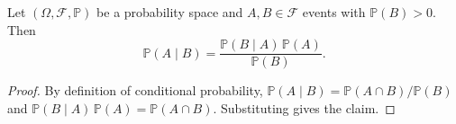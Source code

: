 \documentclass{article}
\begin{document}
\begin{theorem}
Let $(\Omega, \mathcal{F}, \mathbb{P})$ be a probability space and $A, B \in \mathcal{F}$ events with
$\mathbb{P}(B) > 0$. Then
\[
\mathbb{P}(A \mid B) = \frac{\mathbb{P}(B \mid A)\, \mathbb{P}(A)}{\mathbb{P}(B)}.
\]
\end{theorem}

\begin{proof}
By definition of conditional probability,
$\mathbb{P}(A \mid B) = \mathbb{P}(A \cap B) / \mathbb{P}(B)$
and
$\mathbb{P}(B \mid A)\, \mathbb{P}(A) = \mathbb{P}(A \cap B)$.
Substituting gives the claim.
\end{proof}
\end{document}
